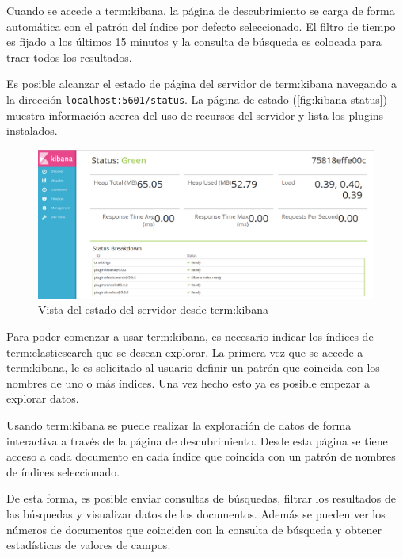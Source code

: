 Cuando se accede a \gls{term:kibana}, la página de descubrimiento se carga de
forma automática con el patrón del índice por defecto seleccionado. El filtro
de tiempo es fijado a los últimos 15 minutos y la consulta de búsqueda es
colocada para traer todos los resultados.

Es posible alcanzar el estado de página del servidor de \gls{term:kibana}
navegando a la dirección \lstinline{localhost:5601/status}. La página de estado
(\autoref{fig:kibana-status}) muestra información acerca del uso de recursos
del servidor y lista los plugins instalados.

\begin{figure}
  \includegraphics[width=\linewidth]{src/images/05-capitulo-5/kibanastatus.jpg}
  \caption{Vista del estado del servidor desde \gls{term:kibana}}
  \label{fig:kibana-status}
\end{figure}

Para poder comenzar a usar \gls{term:kibana}, es necesario indicar los índices
de \gls{term:elasticsearch} que se desean explorar. La primera vez que se accede
a \gls{term:kibana}, le es solicitado al usuario definir un patrón que coincida
con los nombres de uno o más índices. Una vez hecho esto ya es posible empezar a
explorar datos.

Usando \gls{term:kibana} se puede realizar la exploración de datos de forma
interactiva a través de la página de descubrimiento. Desde esta página se tiene
acceso a cada documento en cada índice que coincida con un patrón de nombres de
índices seleccionado.

De esta forma, es posible enviar consultas de búsquedas, filtrar los resultados
de las búsquedas y visualizar datos de los documentos. Además se pueden ver los
números de documentos que coinciden con la consulta de búsqueda y obtener
estadísticas de valores de campos.

